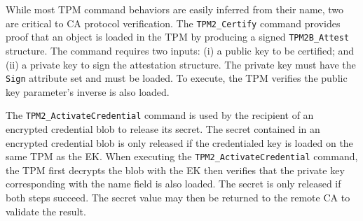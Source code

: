 \documentclass[runningheads]{llncs}
\begin{document}


While most TPM command behaviors are easily inferred from their name,
two are critical to CA protocol verification.  The \verb|TPM2_Certify|
command provides proof that an object is loaded in the TPM by
producing a signed \verb|TPM2B_Attest| structure. The command requires
two inputs: (i) a public key to be certified; and (ii) a private key
to sign the attestation structure. The private key must have the
\verb|Sign| attribute set and must be loaded. To execute, the TPM
verifies the public key parameter's inverse is also loaded.



The \verb|TPM2_ActivateCredential| command is used by the recipient of
an encrypted credential blob to release its secret.  The secret
contained in an encrypted credential blob is only released if the
credentialed key is loaded on the same TPM as the EK.  When executing
the \verb|TPM2_ActivateCredential| command, the TPM first decrypts the
blob with the EK then verifies that the private key corresponding with
the name field is also loaded. The secret is only released if both
steps succeed. The secret value may then be returned to the remote CA
to validate the result.
\end{document}
